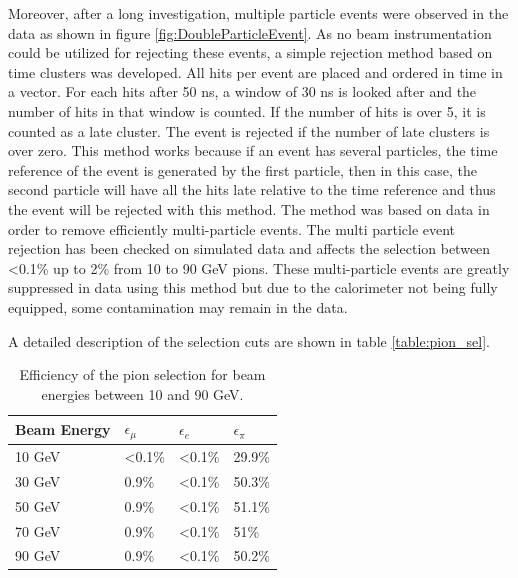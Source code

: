 Moreover, after a long investigation, multiple particle events were observed in the data as shown in figure \ref{fig:DoubleParticleEvent}. As no beam instrumentation could be utilized for rejecting these events, a simple rejection method based on time clusters was developed. All hits per event are placed and ordered in time in a vector. For each hits after 50 ns, a window of 30 ns is looked after and the number of hits in that window is counted. If the number of hits is over 5, it is counted as a late cluster. The event is rejected if the number of late clusters is over zero. This method works because if an event has several particles, the time reference of the event is generated by the first particle, then in this case, the second particle will have all the hits late relative to the time reference and thus the event will be rejected with this method. The method was based on data in order to remove efficiently multi-particle events. The multi particle event rejection has been checked on simulated data and affects the selection between <0.1\% up to 2\% from 10 to 90 GeV pions.
These multi-particle events are greatly suppressed in data using this method but due to the calorimeter not being fully equipped, some contamination may remain in the data.

A detailed description of the selection cuts are shown in table \ref{table:pion_sel}.

\begin{table}[htb!]
	\centering
	\caption{Efficiency of the pion selection for beam energies between 10 and 90 GeV.}
	\label{table:eff_pion}
	\begin{tabular}{@{} llll @{}}
		\hline
		\textbf{Beam Energy} & \textbf{$\epsilon_{\mu}$} & \textbf{$\epsilon_{e}$} & \textbf{$\epsilon_{\pi}$}\\
		\hline
		10 GeV & <0.1\% & <0.1\% & 29.9\%\\
		30 GeV & 0.9\% & <0.1\% & 50.3\%\\
		50 GeV & 0.9\% & <0.1\% & 51.1\%\\
		70 GeV & 0.9\% & <0.1\% & 51\%\\
		90 GeV & 0.9\% & <0.1\% & 50.2\%\\
		\hline
	\end{tabular}
\end{table}

